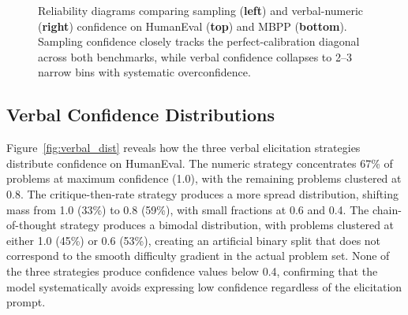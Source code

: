 \documentclass{article}
\begin{document}
\begin{figure}[t]
\caption{Reliability diagrams comparing sampling (\textbf{left}) and verbal-numeric (\textbf{right}) confidence on HumanEval (\textbf{top}) and MBPP (\textbf{bottom}). Sampling confidence closely tracks the perfect-calibration diagonal across both benchmarks, while verbal confidence collapses to 2--3 narrow bins with systematic overconfidence.}
\label{fig:reliability}
\vspace{-0.5em}
\end{figure}

\subsection{Verbal Confidence Distributions}
\label{sec:verbal_dist}

Figure~\ref{fig:verbal_dist} reveals how the three verbal elicitation strategies distribute confidence on HumanEval. The numeric strategy concentrates 67\% of problems at maximum confidence (1.0), with the remaining problems clustered at 0.8. The critique-then-rate strategy produces a more spread distribution, shifting mass from 1.0 (33\%) to 0.8 (59\%), with small fractions at 0.6 and 0.4. The chain-of-thought strategy produces a bimodal distribution, with problems clustered at either 1.0 (45\%) or 0.6 (53\%), creating an artificial binary split that does not correspond to the smooth difficulty gradient in the actual problem set. None of the three strategies produce confidence values below 0.4, confirming that the model systematically avoids expressing low confidence regardless of the elicitation prompt.
\end{document}
